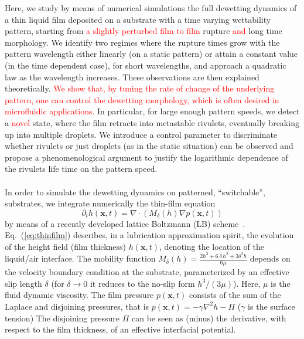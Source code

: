 \documentclass[amsmath,amssymb,showpacs,prf,superscriptaddress, longbibliography]{revtex4-1} %
\newcommand{\REV}[1]{\textcolor{red}{#1}}
\begin{document}
Here, we study by means of numerical simulations the full dewetting dynamics of a thin liquid film deposited on a substrate with a time varying wettability pattern, starting from \REV{a slightly perturbed film to film} rupture \REV{and} long time morphology. 
We identify two regimes where the rupture times grow with the pattern wavelength either linearly (on a static pattern) or attain a constant value (in the time dependent case), for short wavelengths, and approach a quadratic law as the wavelength increases. 
These observations are then explained theoretically. 
\REV{We show that, by tuning the rate of change of the underlying pattern, one can control the dewetting morphology, which is often desired in microfluidic applications.} 
In particular, for large enough pattern speeds, we detect a \REV{novel} state, where the film retracts into metastable rivulets, eventually breaking up into multiple droplets.
We introduce a control parameter to discriminate whether rivulets or just droplets (as in the static situation)
can be observed and propose a phenomenological argument to justify the logarithmic dependence of the rivulets life time on the pattern speed.\\
\\
 In order to simulate the dewetting dynamics on patterned, ``switchable'', substrates, we integrate numerically the thin-film equation~\cite{oronLongscaleEvolutionThin1997,crasterDynamicsStabilityThin2009} 
\begin{equation}\label{eq:thinfilm}
    \partial_t h(\mathbf{x},t) = \nabla\cdot\left(M_{\delta}(h)\nabla p(\mathbf{x},t)\right)
\end{equation}
by means of a recently developed lattice Boltzmann (LB) scheme~\cite{PhysRevE.100.033313,zitzLatticeBoltzmannSimulations2021, zitzSwalbeJlLattice2022a}.
Eq.~(\ref{eq:thinfilm}) describes, in a lubrication approximation spirit, the evolution of the height field (film thickness) $h(\mathbf{x},t)$, denoting the location of the liquid/air interface. The mobility function 
$M_{\delta}(h) = \frac{2h^3 + 6\,\delta\, h^2 + 3\delta^2h}{6\mu}$
depends on the velocity boundary condition at the substrate, parameterized by an effective slip length $\delta$
(for $\delta \rightarrow 0$ it reduces to the no-slip form $h^3/(3\mu)$). Here, $\mu$ is the fluid dynamic viscosity.
The film pressure $p(\mathbf{x},t)$ consists of the sum of the Laplace and disjoining pressures, that is $p(\mathbf{x},t) = -\gamma \nabla^2 h - \Pi$ ($\gamma$ is the surface tension)
The disjoining pressure $\Pi$ can be seen as (minus) the derivative, with respect to the film thickness, of an effective interfacial potential.
\end{document}
